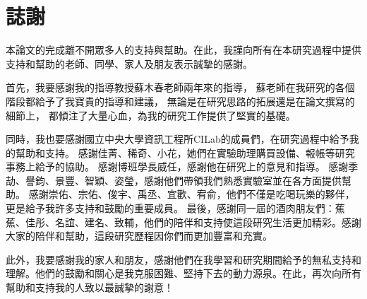 \documentclass[class=NCU_thesis, crop=false]{standalone}
\begin{document}
\chapter{誌謝}

本論文的完成離不開眾多人的支持與幫助。在此，我謹向所有在本研究過程中提供支持和幫助的老師、同學、家人及朋友表示誠摯的感謝。

首先，我要感謝我的指導教授蘇木春老師兩年來的指導，
蘇老師在我研究的各個階段都給予了我寶貴的指導和建議，
無論是在研究思路的拓展還是在論文撰寫的細節上，
都傾注了大量心血，為我的研究工作提供了堅實的基礎。

同時，我也要感謝國立中央大學資訊工程所CILab的成員們，在研究過程中給予我的幫助和支持。
感謝佳菁、稀奇、小花，她們在實驗助理購買設備、報帳等研究事務上給予的協助。
感謝博班學長威任，感謝他在研究上的意見和指導。
感謝季劼、譽鈞、景豐、智穎、姿瑩，感謝他們帶領我們熟悉實驗室並在各方面提供幫助。
感謝崇佑、宗佑、俊宇、禹丞、宜歡、宥俞，他們不僅是吃喝玩樂的夥伴，更是給予我許多支持和鼓勵的重要成員。
最後，感謝同一屆的酒肉朋友們：蕉蕉、佳彤、名誼、建名、致輔，他們的陪伴和支持使這段研究生活更加精彩。感謝大家的陪伴和幫助，這段研究歷程因你們而更加豐富和充實。

此外，我要感謝我的家人和朋友，感謝他們在我學習和研究期間給予的無私支持和理解。他們的鼓勵和關心是我克服困難、堅持下去的動力源泉。在此，再次向所有幫助和支持我的人致以最誠摯的謝意！
\end{document}
